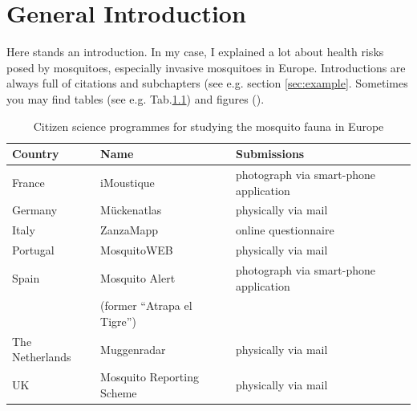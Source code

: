 \documentclass[%
a4paper,12pt,ngerman,UKenglish,twoside]{book}
\begin{document}
\chapter[General Introduction]{General Introduction}
\begin{refsection}

Here stands an introduction. In my case, I explained a lot about health risks posed by mosquitoes, especially invasive mosquitoes in Europe. Introductions are always full of citations \cite{kampen_approaches_2015, bartumeus_citizen_2018, caputo_zanzamapp_2020} and subchapters (see e.g. section \ref{sec:example}. Sometimes you may find tables (see e.g. Tab.\ref{Tab:CitizenScience}) and figures (). 

\begin{table}[htb!]
\begin{center}
\caption[Citizen science programmes for studying the mosquito fauna in Europe]{Citizen science programmes for studying the mosquito fauna in Europe  \cite{kampen_approaches_2015, bartumeus_citizen_2018, caputo_zanzamapp_2020}}
\begin{small}
\begin{tabular}{lll}
\toprule
Country & Name & Submissions \\ 
\toprule
France & iMoustique & photograph via smart-phone application\\ 
Germany & Mückenatlas & physically via mail \\ 
Italy & ZanzaMapp & online questionnaire\\
Portugal & MosquitoWEB & physically via mail \\ 
Spain & Mosquito Alert & photograph via smart-phone application\\ 
& (former “Atrapa el Tigre”) &\\
The Netherlands & Muggenradar & physically via mail \\ 
UK & Mosquito Reporting Scheme & physically via mail \\ 
\bottomrule
\end{tabular} 
\end{small}
\label{Tab:CitizenScience}
\end{center}
\end{table}


\end{refsection}
\end{document}
